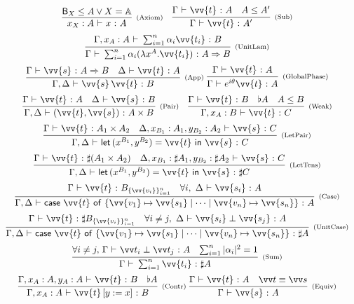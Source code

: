 \documentclass[runningheads,orivec,envcountsame,envcountsect]{llncs}
\newcommand\AbsBasis{\ensuremath{\mathbb{A}}}
\def\Pair#1#2{(#1,#2)} %
\def\Lam#1#2#3{\lambda#1^{#2}{.}#3} %
\def\letkeyword{\mathsf{let}}
\def\inkeyword{\mathsf{in}}
\def\LetP#1#2#3#4#5#6{\letkeyword\,\Pair{#1^{#2}}{#3^{#4}}=#5~\inkeyword~#6}
\def\gencase#1#2#3#4#5{\ensuremath{\mathsf{case}~#1~\mathsf{of}~\{#2\mapsto #4 \mid \dotsb \mid #3\mapsto #5\}}}
\def\Arr{\Rightarrow}
\def\SUB#1#2{#1\le#2}
\def\TYP#1#2#3{#1~{\vdash}~#2~{:}~#3}
\def\SORTH#1#2#3#4{#1~{\vdash}~#2\perp#3~{:}~#4}
\def\snam#1{\textsc{\scriptsize\upshape(#1)}}
\newcommand\basis[1]{\ensuremath{\mathsf{B}_{#1}}}
\newcommand\genbasis[3]{\ensuremath{B_{\{#1\}_{#2}^{#3}}}}
\begin{document}
\begin{table}[t]
    $
    \begin{array}{c}
    \infer[\snam{Axiom}]{\TYP{x_X:A}{x}{A}}{\basis{X}\leq A \vee X=\AbsBasis}\quad
    \infer[\snam{Sub}]{\TYP{\Gamma}{\vv{t}}{A'}}{
        \TYP{\Gamma}{\vv{t}}{A} & \SUB{A}{A'}
    }\\
    \noalign{\medskip}
    \infer[\snam{UnitLam}]{
        \TYP{\Gamma}{\sum_{i=1}^n \alpha_i (\Lam{x}{A}{\vv{t_i}})}{A\Arr B}
    }{\TYP{\Gamma,x_A: A}{\sum_{i=1}^{n}\alpha_i\vv{t_i}}{B}
    }\\
    \noalign{\medskip}
    \infer[\snam{App}]{\TYP{\Gamma,\Delta}{\vv{s}\,\vv{t}}{B}}{
        \TYP{\Gamma}{\vv{s}}{A\Arr B} & \TYP{\Delta}{\vv{t}}{A}
    }\ 
    \infer[\snam{GlobalPhase}]{\TYP{\Gamma}{e^{i\theta}\vv{t}}{A}}
    {\TYP{\Gamma}{\vv{t}}{A}}
    \\
    \noalign{\medskip}
    \infer[\snam{Pair}]{\TYP{\Gamma,\Delta}
        {\Pair{\vv{t}}{\vv{s}}}{A\times B}}{
        \TYP{\Gamma}{\vv{t}}{A}&\TYP{\Delta}{\vv{s}}{B}
    }\quad
    \infer[\snam{Weak}]{\TYP{\Gamma,x_A:B}{\vv{t}}{C}}{
        \TYP{\Gamma}{\vv{t}}{B}& \flat{A} & A\leq B
    }
    \\
    \noalign{\medskip}
    \infer[\snam{LetPair}]{\TYP{\Gamma,\Delta} 
        {\LetP{x}{B_1}{y}{B_2}{\vv{t}}{\vv{s}}}{C}}{
        \TYP{\Gamma}{\vv{t}}{A_1\times A_2}&
        \TYP{\Delta,x_{B_1}:A_1,y_{B_2}:A_2}{\vv{s}}{C}
    }\\
    \noalign{\medskip}
    \infer[\snam{LetTens}]{\TYP{\Gamma,\Delta}
        {\LetP{x}{B_1}{y}{B_2}{\vv{t}}{\vv{s}}}{\sharp C}}{
        \TYP{\Gamma}{\vv{t}}{\sharp(A_1\times A_2)}&
        \TYP{\Delta,x_{B_1}:\sharp A_1,y_{B_2}:\sharp A_2}{\vv{s}}{C}
    }\\
    \noalign{\medskip}
    \infer[\snam{Case}]{\TYP{\Gamma,\Delta}
        {\gencase{\vv{t}}{\vv{v_1}}{\vv{v_n}}{\vv{s_1}}{\vv{s_n}}}{A}}{
        \TYP{\Gamma}{\vv{t}}{\genbasis{\vv{v_i}}{i=1}{n}}&
        \forall i,\ \TYP{\Delta}{\vv{s_i}}{A}
    }\\
    \noalign{\medskip}
    \infer[\snam{UnitCase}]{\TYP{\Gamma,\Delta}
        {\gencase{\vv{t}}{\vv{v_1}}{\vv{v_n}}{\vv{s_1}}{\vv{s_n}}}{\sharp A}}{
        \TYP{\Gamma}{\vv{t}}{\sharp \genbasis{\vv{v_i}}{i=1}{n}}&
        \forall i\neq j,\ \SORTH{\Delta}{\vv{s_i}}{\vv{s_j}}{A}
    }\\
    \noalign{\medskip}
    \infer[\snam{Sum}]
        {\TYP{\Gamma}{\sum_{i=1}^{n} \vv{t_i}}{\sharp A}}
        {\forall i\neq j,\, \SORTH{\Gamma}{\vv t_i}{\vv t_j}{A} &
        \sum_{i=1}^{n}|\alpha_i|^2 = 1}
    \\
    \noalign{\medskip}
    \infer[\snam{Contr}]{\TYP{\Gamma,x_A:A}{\vv{t}\,[y:=x]}{B}}{
        \TYP{\Gamma,x_A:A,y_A:A}{\vv{t}}{B}&\flat{A}
    }\ 
    \infer[\snam{Equiv}]{\TYP{\Gamma}{\vv{s}}{A}}{
        \TYP{\Gamma}{\vv{t}}{A}& \vv t\equiv \vv s
    }\\
    \noalign{\medskip}
    \end{array}
    $


\end{table}
\end{document}

